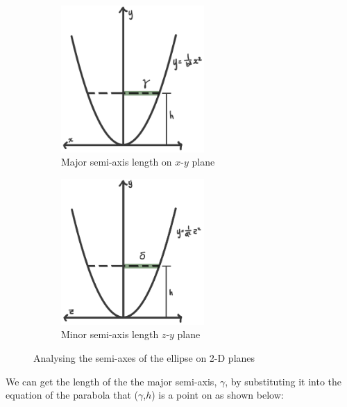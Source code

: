 \documentclass[12pt]{article}
\begin{document}
\begin{figure}[h]
     \centering
     \begin{subfigure}[b]{0.45\textwidth}
         \centering
         \includegraphics[width=0.6\textwidth]{more images/gamma.jpg}
         \caption{Major semi-axis length on $x$-$y$ plane}
         \label{fig:xy}
     \end{subfigure}
     \hfill
     \begin{subfigure}[b]{0.45\textwidth}
         \centering
         \includegraphics[width=0.6\textwidth]{more images/delta.jpg}
         \caption{Minor semi-axis length $z$-$y$ plane}
         \label{fig:zy}
     \end{subfigure}
     \hfill
        \caption{Analysing the semi-axes of the ellipse on 2-D planes}
        \label{fig:axes}
\end{figure}

We can get the length of the the major semi-axis, $\gamma$, by substituting it into the equation of the parabola that  ($\gamma$,$h$) is a point on as shown below:
\end{document}
